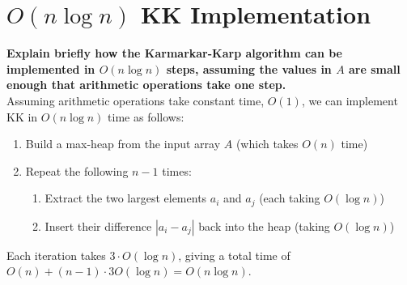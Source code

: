 \documentclass[11pt]{article}
\begin{document}
\section{$O(n \log n)$ KK Implementation}
{\bf Explain briefly how the Karmarkar-Karp algorithm can be 
implemented in $O(n \log n)$ steps, assuming the values in 
$A$ are small enough that arithmetic operations take one step.} \\
Assuming arithmetic operations take constant time, $O(1)$, we can implement KK in $O(n \log n)$ time as follows: 
\begin{enumerate}
	\setlength{\itemsep}{0pt}\setlength{\topsep}{0pt}
	\item Build a max-heap from the input array $A$ (which takes $O(n)$ time)
	\item Repeat the following $n-1$ times:
	\begin{enumerate}
		\item Extract the two largest elements $a_i$ and $a_j$ (each taking $O(\log n)$)
		\item Insert their difference $|a_i - a_j|$ back into the heap (taking $O(\log n)$)
	\end{enumerate}
\end{enumerate}
Each iteration takes $3 \cdot O(\log n)$, giving a total time of $O(n) + (n-1)\cdot 3O(\log n) = O(n \log n)$.
\end{document}
